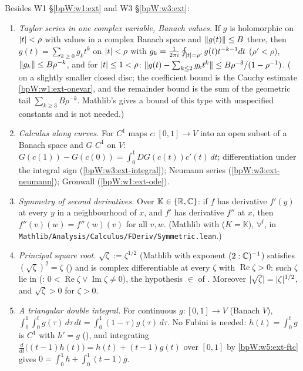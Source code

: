 Besides W1 \S\ref{bpW:w1:ext} and W3 \S\ref{bpW:w3:ext}:
{\raggedright
\begin{enumerate}[label=(W5-E\arabic*),ref=(W5-E\arabic*)]
\item\label{bpW:w5:ext-taylor} \emph{Taylor series in one complex variable, Banach values.} If $g$ is holomorphic on
  $\lvert t\rvert<\rho$ with values in a complex Banach space and $\lVert g(t)\rVert\le B$ there, then
  $g(t)=\sum_{k\ge0}g_kt^k$ on $\lvert t\rvert<\rho$ with $g_k=\frac1{2\pi i}\oint_{\lvert t\rvert=\rho'}g(t)t^{-k-1}dt$ ($\rho'<\rho$),
  $\lVert g_k\rVert\le B\rho^{-k}$, and for $\lvert t\rvert\le1<\rho$: $\lVert g(t)-\sum_{k\le2}g_kt^k\rVert\le B\rho^{-3}/(1-\rho^{-1})$.
  ( on a slightly smaller closed disc; the coefficient bound is the Cauchy estimate
  \ref{bpW:w1:ext-onevar}, and the remainder bound is the sum of the geometric tail $\sum_{k\ge3}B\rho^{-k}$. Mathlib's
   gives a bound of this type with unspecified constants and is not
  needed.)
\item\label{bpW:w5:ext-ftc} \emph{Calculus along curves.} For $C^1$ maps $c:[0,1]\to V$ into an open subset of a
  Banach space and $G$ $C^1$ on $V$: $G(c(1))-G(c(0))=\int_0^1DG(c(t))c'(t)\,dt$; differentiation under the
  integral sign (\ref{bpW:w3:ext-integral}); Neumann series (\ref{bpW:w3:ext-neumann}); Gronwall (\ref{bpW:w1:ext-ode}).
\item\label{bpW:w5:ext-symm} \emph{Symmetry of second derivatives.} Over $\mathbb K\in\{\mathbb{R},\mathbb{C}\}$: if $f$ has derivative $f'(y)$
  at every $y$ in a neighbourhood of $x$, and $f'$ has derivative $f''$ at $x$, then $f''(v)(w)=f''(w)(v)$ for all $v,w$.
  (Mathlib  with \Lean{[IsRCLikeNormedField K]} ($K=\mathbb K$),
  $\forall^{\mathsf f}$, in
  \texttt{Mathlib/Analysis/Calculus/FDeriv/Symmetric.lean}.)
\item\label{bpW:w5:ext-sqrt} \emph{Principal square root.} $\sqrt\zeta:=\zeta^{1/2}$ (Mathlib  with exponent
  $(2:\mathbb{C})^{-1}$) satisfies $(\sqrt\zeta)^2=\zeta$ () and is complex differentiable at every
  $\zeta$ with $\operatorname{Re}\zeta>0$: such $\zeta$ lie in  (:
  $0<\operatorname{Re}\zeta\vee\operatorname{Im}\zeta\ne0$), the hypothesis $\in$ of
  . Moreover $\lvert \sqrt\zeta\rvert=\lvert \zeta\rvert^{1/2}$, and $\sqrt\zeta>0$ for $\zeta>0$.
\item\label{bpW:w5:ext-triangle} \emph{A triangular double integral.} For continuous $g:[0,1]\to V$ (Banach $V$),
  $\int_0^1\int_0^tg(\tau)\,d\tau\,dt=\int_0^1(1-\tau)g(\tau)\,d\tau$. No Fubini is needed: $h(t)=\int_0^tg$ is $C^1$ with $h'=g$
  (), and integrating $\frac d{dt}\bigl((t-1)h(t)\bigr)=h(t)+(t-1)g(t)$ over
  $[0,1]$ by \ref{bpW:w5:ext-ftc} gives $0=\int_0^1h+\int_0^1(t-1)g$.
\end{enumerate}
\par}

